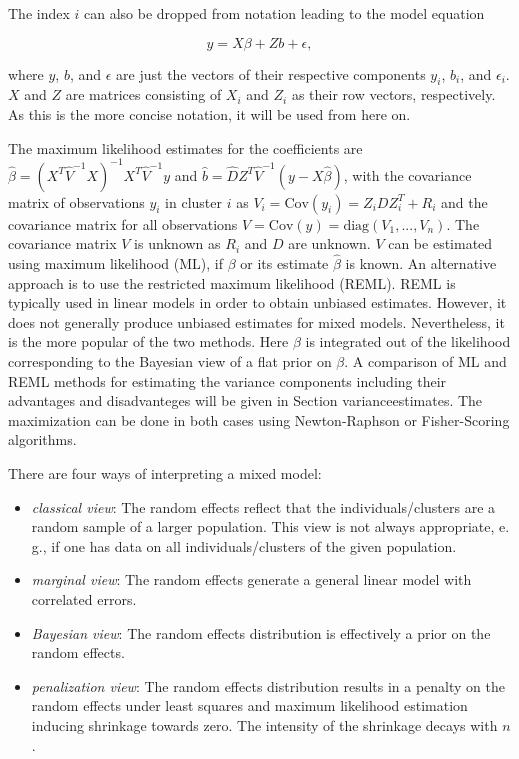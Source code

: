 \documentclass[12pt]{article}
\begin{document}
The index $i$ can also be dropped from notation leading to the model equation 

$$y = X \beta + Z b + \epsilon,$$

where $y$, $b$, and $\epsilon$ are just the vectors of their respective components $y_i$, $b_i$, and    $\epsilon_i$. $X$ and $Z$ are matrices consisting of $X_i$ and $Z_i$ as their row vectors, respectively. As this is the more concise notation, it will be used from here on.

The maximum likelihood estimates for the coefficients are $\hat{\beta} = (X^T \hat{V}^{-1} X)^{-1} X^T \hat{V}^{-1}y$ and $\hat{b} = \hat{D}Z^T\hat{V}^{-1} (y-X\hat{\beta})$, with the covariance matrix of observations $y_i$ in cluster $i$ as $V_i = \mathrm{Cov}(y_i) = Z_iDZ_i^T + R_i$ and the covariance matrix for all observations $V = \mathrm{Cov}(y) = \mathrm{diag}(V_1,...,V_n)$.
The covariance matrix $V$ is unknown as $R_i$ and $D$ are unknown. $V$ can be estimated  using maximum likelihood (ML), if $\beta$ or its estimate $\hat{\beta}$ is known. An alternative approach is to use the restricted  maximum likelihood  (REML). REML is typically used in linear models in order to obtain unbiased estimates. However, it does not generally produce unbiased estimates for mixed models. Nevertheless, it is the more popular of the two methods. Here $\beta$ is integrated out of the likelihood corresponding to the Bayesian view of a flat prior on $\beta$. A comparison of ML and REML methods for estimating the variance components including their advantages and disadvanteges will be given in Section {varianceestimates}.  The maximization can be done in both cases using Newton-Raphson or Fisher-Scoring algorithms. 

There are four ways of interpreting a mixed model:
\begin{itemize}
\item \textit{classical view}: The random effects reflect that the individuals/clusters are a random sample of a larger population. This view is not always appropriate, e.\,g., if one has data on all individuals/clusters of the given population.
\item \textit{marginal view}: The random effects generate a general linear
model with correlated errors.
\item \textit{Bayesian view}: The random effects distribution is effectively a prior on the random effects.
\item \textit{penalization view}: The random effects distribution results in a penalty on the random effects under least squares and maximum likelihood estimation inducing shrinkage towards zero. The intensity of the shrinkage decays with $n$.
\end{itemize}
\end{document}
